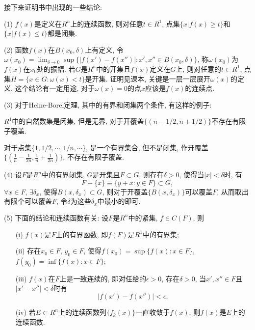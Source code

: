 \documentclass[12pt,a4paper,openany]{book}
\begin{document}
接下来证明书中出现的一些结论:

(1) $f(x)$是定义在$R^n$上的连续函数, 则对任意$t \in R^1$, 点集$\{x | f(x) \ge t\}$和$\{x | f(x) \le t\}$都是闭集.

(2) 函数$f(x)$在$B(x_0, \delta)$上有定义, 令$\omega(x_0) = \lim_{\delta \rightarrow 0}{\sup\{|f(x') - f(x'')| : x', x'' \in B(x_0, \delta)\}}$, 称$\omega(x_0)$为$f(x)$在$x_0$处的振幅. 若$G$是$R^n$中的开集且$f(x)$定义在$G$上, 则对任意的$t \in R^1$, 点集$H = \{ x \in G : \omega(x) < t\}$是开集. 证明见课本, 关键是一层一层展开$\omega(x)$的定义, 这个结论有一定用途, 对于$\omega(x) = 0$的点$x$应该是$f(x)$的连续点.

(3) 对于Heine-Borel定理, 其中的有界和闭集两个条件, 有这样的例子:

$R^1$中的自然数集是闭集, 但是无界, 对于开覆盖$\{(n - 1/2, n + 1/2)\}$不存在有限子覆盖.

对于点集$\{1, 1/2, \cdots, 1/n, \cdots\}$, 是一个有界集合, 但不是闭集, 作开覆盖$\{(\frac{1}{n} - \frac{1}{2n}, \frac{1}{n} + \frac{1}{2n})\}$, 不存在有限子覆盖.

(4) 设$F$是$R^n$中的有界闭集, $G$是开集且$F \subset G$, 则存在$\delta > 0$, 使得当$|x| < \delta$时, 有
\[
F + \{x\} \equiv \{ y + x: y \in F\} \subset G,
\]
$\forall x \in F$, $\exists \delta_x$, 使得$B(x, \delta_x) \subset G$, 则对于开覆盖$\{B(x, \delta_x)\}$可以覆盖$F$, 从而取出有限个可以覆盖$F$, 令$\delta$为这些$\delta_x$中最小的即可.

(5) 下面的结论和连续函数有关: 设$F$是$R^n$中的紧集, $f \in C(F)$, 则
\begin{enumerate}
\item [(i)] $f(x)$是$F$上的有界函数, 即$f(F)$是$R^1$中的有界集;
\item [(ii)] 存在$x_0 \in F$, $y_0 \in F$, 使得$f(x_0) = \sup\{f(x) : x \in F\}$, $f(y_0) = \inf\{f(x): x \in F\}$;
\item [(iii)] $f(x)$在$F$上是一致连续的, 即对任给的$\epsilon > 0$, 存在$\delta > 0$, 当$x', x'' \in F$且$|x' - x''| < \delta$时有
\[
|f(x') - f(x'')| < \epsilon;
\]
\item [(iv)] 若$E \subset R^n$上的连续函数列$\{f_k(x)\}$一直收敛于$f(x)$, 则$f(x)$是$E$上的连续函数.
\end{enumerate}
\end{document}
